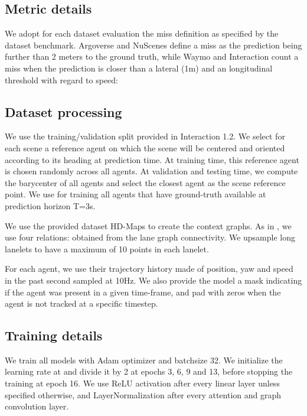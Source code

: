 \documentclass{article} \usepackage{iclr2022_conference,times}
\begin{document}
\subsection{Metric details}
\label{sec:miss}

We adopt for each dataset evaluation the miss definition as specified by the dataset benchmark. Argoverse \citep{chang2019argoverse} and NuScenes \citep{caesar2020nuscenes} define a miss as the prediction being further than 2 meters to the ground truth, while Waymo \citep{ettinger2021large} and Interaction \citet{zhan2019interaction}count a miss when the prediction is closer than a lateral (1m) and an longitudinal threshold with regard to speed:



\subsection{Dataset processing}
\label{sec:dataset}

We use the training/validation split provided in Interaction 1.2. 
We select for each scene a reference agent on which the scene will be centered and oriented according to its heading at prediction time.
At training time, this reference agent is chosen randomly across all agents. At validation and testing time, we compute the barycenter of all agents and select the closest agent as the scene reference point. We use for training all agents that have ground-truth available at prediction horizon T=3s.

We use the provided dataset HD-Maps to create the context graphs. As in \citet{liang2020learning}, we use four relations: obtained from the lane graph connectivity. We upsample long lanelets to have a maximum of 10 points in each lanelet.

For each agent, we use their trajectory history made of position, yaw and speed in the past second sampled at 10Hz. We also provide the model a mask indicating if the agent was present in a given time-frame, and pad with zeros when the agent is not tracked at a specific timestep. 

\subsection{Training details}
\label{sec:training}

We train all models with Adam optimizer and batchsize 32. We initialize the learning rate at  and divide it by 2 at epochs 3, 6, 9 and 13, before stopping the training at epoch 16. We use ReLU activation after every linear layer unless specified otherwise, and LayerNormalization after every attention and graph convolution layer.
\end{document}
